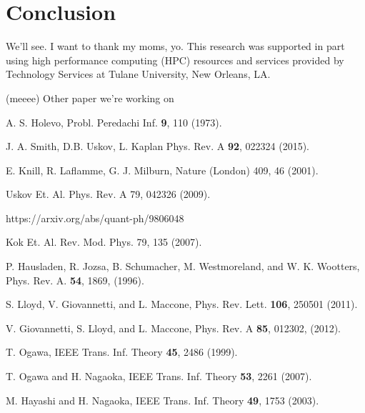 \documentclass[aps,pra,twocolumn,showpacs,superscriptaddress,floatfix,10pt]{revtex4}
\begin{document}
\section{Conclusion}
We'll see.
\acknowledgments
I want to thank my moms, yo. This research was supported in part using high performance computing (HPC) resources and services provided by Technology Services at Tulane University, New Orleans, LA.
\begin{thebibliography}{99}

 (meeee) Other paper we're working on

 A. S. Holevo, Probl. Peredachi Inf. \textbf{9}, 110 (1973).	

 J. A. Smith, D.B. Uskov, L. Kaplan Phys. Rev. A \textbf{92}, 022324 (2015).

  E. Knill, R. Laflamme, G. J. Milburn, Nature (London) 409, 46 (2001).

 Uskov Et. Al.
Phys. Rev. A 79, 042326 (2009).

 https://arxiv.org/abs/quant-ph/9806048

 Kok Et. Al.
Rev. Mod. Phys. 79, 135 (2007).

 P. Hausladen, R. Jozsa, B. Schumacher, M. Westmoreland, and W. K. Wootters, Phys. Rev. A. \textbf{54}, 1869, (1996).

 S. Lloyd, V. Giovannetti, and L. Maccone, Phys. Rev. Lett. \textbf{106}, 250501 (2011).

 V. Giovannetti, S. Lloyd, and L. Maccone, Phys. Rev. A \textbf{85}, 012302, (2012).


 T. Ogawa, IEEE Trans. Inf. Theory \textbf{45}, 2486 (1999).

 T. Ogawa and H. Nagaoka, IEEE Trans. Inf. Theory \textbf{53}, 2261 (2007).

 M. Hayashi and H. Nagaoka, IEEE Trans. Inf. Theory \textbf{49}, 1753 (2003).

\end{thebibliography}
\end{document}
